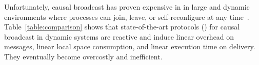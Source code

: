 
Unfortunately, causal broadcast has proven expensive in in large and dynamic
environments where processes can join, leave, or self-reconfigure at any
time~\cite{charronbost1991concerning}. 
Table~\ref{table:comparison} shows that state-of-the-art protocols (\REF) for
causal broadcast in dynamic systems are reactive and induce linear overhead on
messages, linear local space consumption, and linear execution time on
delivery. They eventually become overcostly and inefficient.



